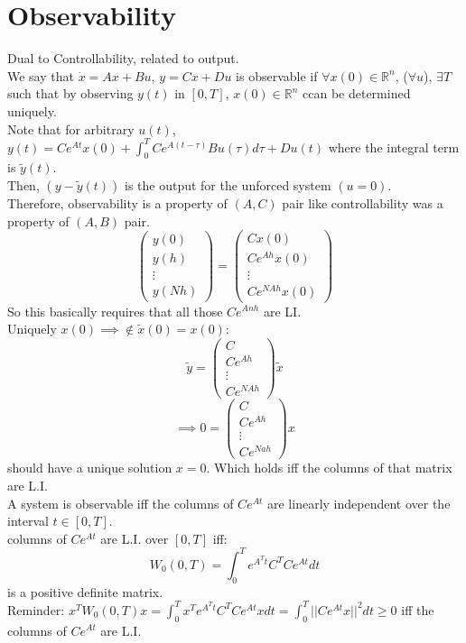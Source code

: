 \documentclass{article}
\begin{document}
\section{Observability}
Dual to Controllability, related to output.\\
We say that $\dot{x}=Ax+Bu$, $y=Cx+Du$ is observable if $\forall x(0)\in\mathbb{R}^n$, ($\forall u$), $\exists T$ such that by observing $y(t)$ in $[0,T]$, $x(0)\in\mathbb{R}^n$ ccan be determined uniquely.\\
Note that for arbitrary $u(t)$, $y(t)=Ce^{At}x(0)+\int_0^TCe^{A(t-\tau)}Bu(\tau)d\tau+Du(t)$ where the integral term is $\tilde{y}(t)$.\\
Then, $(y-\tilde{y}(t))$ is the output for the unforced system $(u=0)$.\\
Therefore, observability is a property of $(A,C)$ pair like controllability was a property of $(A,B)$ pair.\\
\[\begin{pmatrix}y(0)\\y(h)\\\vdots\\y(Nh)\end{pmatrix}=\begin{pmatrix}Cx(0)\\Ce^{Ah}x(0)\\\vdots\\Ce^{NAh}x(0)\end{pmatrix}\]
So this basically requires that all those $Ce^{Anh}$ are LI.\\
Uniquely $x(0)\implies \notin \tilde{x}(0)=x(0)$:
\[\tilde{y}=\begin{pmatrix}C\\Ce^{Ah}\\\vdots\\Ce^{NAh}\end{pmatrix}\tilde{x}\]
\[\implies 0=\begin{pmatrix}C\\Ce^{Ah}\\\vdots\\Ce^{Nah}\end{pmatrix}x\]
should have a unique solution $x=0$. Which holds iff the columns of that matrix are L.I.\\

A system is observable iff the columns of $Ce^{At}$ are linearly independent over the interval $t\in [0,T]$.\\
columns of $Ce^{At}$ are L.I. over $[0,T]$ iff:
\[W_0(0,T)=\int_0^Te^{A^Tt}C^TCe^{At}dt\]
is a positive definite matrix.\\
Reminder: $x^TW_0(0,T)x=\int_0^Tx^Te^{A^Tt}C^TCe^{At}xdt=\int_0^T\lvert\lvert Ce^{At}x\rvert\rvert^2dt\geq 0$ iff the columns of $Ce^{At}$ are L.I.\\
\end{document}
